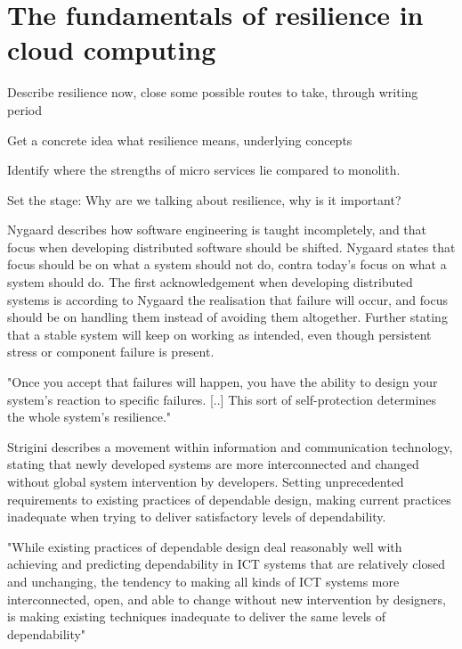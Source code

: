 \chapter{The fundamentals of resilience in cloud computing}
\label{ch:resillience}
Describe resilience now, close some possible routes to take, through writing period


Get a concrete idea what resilience means, underlying concepts


Identify where the strengths of micro services lie compared to monolith.


Set the stage: Why are we talking about resilience, why is it important?



Nygaard describes how software engineering is taught incompletely, and that focus when developing distributed software should be shifted. Nygaard states that focus should be on what a system should not do, contra today's focus on what a system should do. The first acknowledgement when developing distributed systems is according to Nygaard the realisation that failure will occur, and focus should be on handling them instead of avoiding them altogether. Further stating that a stable system will keep on working as intended, even though persistent stress or component failure is present.

\begin{quote_highlight}
"Once you accept that failures will happen, you have the ability to design your system's reaction to specific failures. [..] This sort of self-protection determines the whole system's resilience." \cite[p. 27]{nygard2007release}
\end{quote_highlight}

Strigini describes a movement within information and communication technology, stating that newly developed systems are more interconnected and changed without global system intervention by developers. Setting unprecedented requirements to existing practices of dependable design, making current practices inadequate when trying to deliver satisfactory levels of dependability.

\begin{quote_highlight}
"While existing practices of dependable design deal reasonably well with achieving and predicting dependability in ICT systems that are relatively closed and unchanging, the tendency to making all kinds of ICT systems more interconnected, open, and able to change without new intervention by designers, is making existing techniques inadequate to deliver the same levels of dependability"\cite[p. 5]{strigini2012fault}
\end{quote_highlight}

